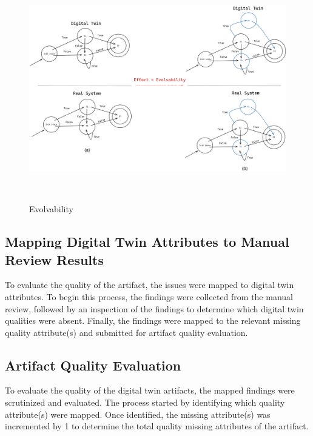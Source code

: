 \documentclass{llncs}
\begin{document}
    \begin{figure}[htbp]
        \includegraphics[width = 1\textwidth]{Evolvability.png}
        \caption{Evolvability}
        ~\label{fig:Evolvability}
    \end{figure}

    \subsection{Mapping Digital Twin Attributes to Manual Review Results}
    To evaluate the quality of the artifact, the issues were mapped to digital twin attributes. 
    To begin this process, the findings were collected from the manual review, followed by an inspection of the findings to determine which digital twin qualities were absent. 
    Finally, the findings were mapped to the relevant missing quality attribute(s) and submitted for artifact quality evaluation. 
    
    \subsection{Artifact Quality Evaluation}
    To evaluate the quality of the digital twin artifacts, the mapped findings were scrutinized and evaluated. 
    The process started by identifying which quality attribute(s) were mapped. 
    Once identified, the missing attribute(s) was incremented by 1 to determine the total quality missing attributes of the artifact. 
    
\end{document}
